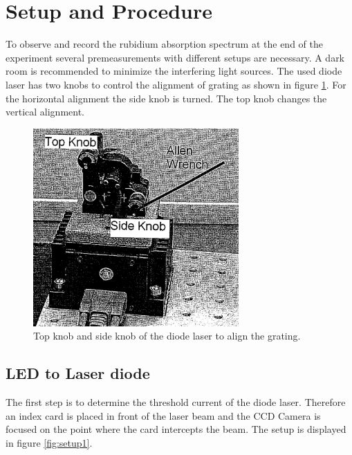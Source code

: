 \section{Setup and Procedure}
\label{sec:setup}
To observe and record the rubidium absorption spectrum at the end
of the experiment
several premeasurements with different setups are necessary.
A dark room is recommended to minimize the
interfering light sources.
The used diode laser has two knobs to control the alignment of grating
as shown in figure \ref{fig:knobs}.
For the horizontal alignment the side knob is turned. The
top knob changes the vertical alignment.
\begin{figure}
  \centering
  \includegraphics[width=0.7\textwidth]{Laserknobs.png}
  \caption{Top knob and side knob of the diode laser to align the grating.\cite{V60}}
  \label{fig:knobs}
\end{figure}


\subsection{LED to Laser diode}
\label{subsec:LED_Laser}

The first step is to determine the threshold current
of the diode laser.
Therefore an index card is placed in front of the laser beam and the CCD Camera
is focused on the point where the card intercepts the beam.
The setup is displayed
in figure \ref{fig:setup1}.

